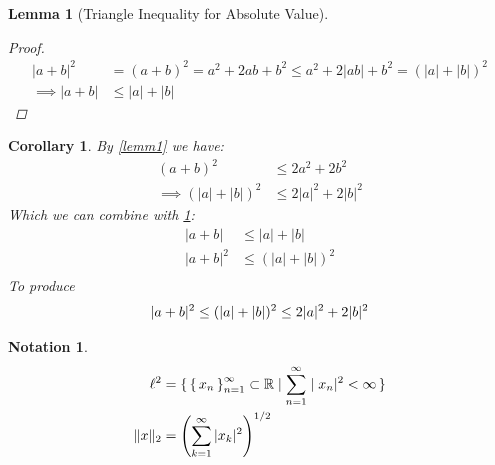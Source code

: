 \documentclass[dvipsnames,12pt]{exam}
\newcommand{\R}{{\mathbb{R}}}
\newcommand{\norm}[1]{\Vert #1 \Vert}
\newtheorem{corollary}{Corollary}[theorem]
\newtheorem{lemma}[theorem]{Lemma}
\newtheorem*{notation}{Notation}
\theoremstyle{definition}
\begin{document}
\begin{lemma}[Triangle Inequality for Absolute Value]\label{lemm2}

    \begin{proof}
    \begin{align*}
        |a+b|^2 &= (a+b)^2 = a^2 + 2ab + b^2 \leq a^2 + 2|ab| + b^2 = (|a| + |b|)^2 \\
        \implies |a+b| &\leq |a| + |b|
    \end{align*}
    \end{proof}
\end{lemma}

\begin{corollary}
    By \ref{lemm1} we have:
    \begin{align*}
        (a+b)^2 &\leq 2a^2 + 2b^2 \\
        \implies (|a|+|b|)^2 &\leq 2|a|^2 + 2|b|^2
    \end{align*}
    Which we can combine with \ref{lemm2}:
    \begin{align*}
        |a + b| &\leq |a| + |b|\\
        |a + b|^2 &\leq (|a| + |b|)^2\\
    \end{align*}
    To produce
    \begin{equation}\label{result1}
        |a + b|^2 \leq (|a| + |b|)^2 \leq 2|a|^2 + 2|b|^2\\
    \end{equation}
\end{corollary}

\begin{notation}
    \begin{align}
        \ell^2 &= \set{\set{x_n}^\infty_{n=1} \subset \R \mid \sum^\infty_{n=1} |x_n|^2 < \infty}\label{l2} \\ 
        \norm{x}_2 &= \left( \sum_{k=1}^\infty |x_k|^2 \right)^{1/2} \label{norm}
    \end{align}
\end{notation}
\end{document}
